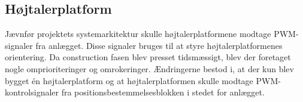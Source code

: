 \subsection{Højtalerplatform}
Jævnfør projektets systemarkitektur skulle højtalerplatformene modtage PWM-signaler fra anlægget. Disse signaler bruges til at styre højtalerplatformenes orientering. Da construction fasen blev presset tidsmæssigt, blev der foretaget nogle omprioriteringer og omrokeringer. Ændringerne bestod i, at der kun blev bygget én højtalerplatform og at højtalerplatformen skulle modtage PWM-kontrolsignaler fra positionsbestemmelsesblokken i stedet for anlægget. 